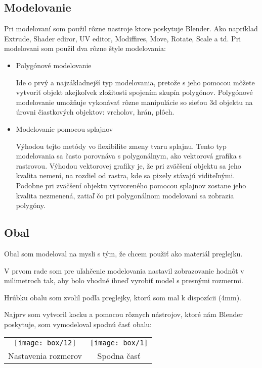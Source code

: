     \subsection{Modelovanie}
      Pri modelovaní som použil rôzne nastroje ktore poskytuje Blender. Ako napríklad Extrude, Shader ediror, UV editor, Modiffires, Move, Rotate, Scale a td. Pri modelovani som použil dva rôzne štyle modelovania:
      \begin{itemize}
        \item{
            Polygónové modelovanie

            Ide o prvý a najzákladnejší typ modelovania, pretože s jeho pomocou môžete vytvoriť objekt akejkoľvek zložitosti spojením skupín polygónov.
            Polygónové modelovanie umožňuje vykonávať rôzne manipulácie so sieťou 3d objektu na úrovni čiastkových objektov: vrcholov, hrán, plôch.
        }
        \item{
            Modelovanie pomocou splajnov

            Výhodou tejto metódy vo flexibilite zmeny tvaru splajnu.
            Tento typ modelovania sa často porovnáva s polygonálnym, ako vektorová grafika s rastrovou. Výhodou vektorovej grafiky je, že pri zväčšení objektu sa jeho kvalita nemení, na rozdiel od rastra, kde sa pixely stávajú viditeľnými. Podobne pri zväčšení objektu vytvoreného pomocou splajnov zostane jeho kvalita nezmenená, zatiaľ čo pri polygonálnom modelovaní sa zobrazia polygóny.
        }
      \end{itemize}

      \subsection{Obal}
        Obal som modeloval na mysli s tým, že chcem použiť ako materiál preglejku.

        V prvom rade som pre uľahčenie modelovania nastavil zobrazovanie hodnôt v milimetroch tak, aby bolo vhodné ihneď vyrobiť model s presnými rozmermi.

        Hrúbku obalu som zvolil podľa preglejky, ktorú som mal k dispozícii (4mm).

        Najprv som vytvoril kocku a pomocou rôznych nástrojov, ktoré nám Blender poskytuje, som vymodeloval spodnú časť obalu:

        \begin{tabular}{c c}
          \texttt{[image: box/12]} &  \texttt{[image: box/1]} \\
          Nastavenia rozmerov & Spodna časť \\
        \end{tabular}

